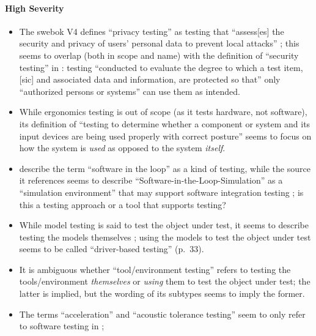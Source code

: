 \ifnotpaper\paragraph{High Severity}\fi
\begin{itemize}
    \item The \acs{swebok} V4 defines ``privacy testing'' as testing that
          ``assess[es] the security and privacy of users' personal data to
          prevent local attacks'' \citep[p.~5-10]{SWEBOK2024}; this seems to
          overlap (both in scope and name) with
          the definition of ``security testing'' in \citep{IEEE2022}: testing
          ``conducted to evaluate the degree to which a test item, [sic] and
          associated data and information, are protected so that'' only
          ``authorized persons or systems'' can use them as intended.
          \ifnotpaper
    \item While ergonomics testing is out of scope (as it tests hardware, not
          software), its definition of ``testing to determine whether a
          component or system and its input devices are being used properly
          with correct posture'' \citepISTQB{} seems to focus on how the
          system is \emph{used} as opposed to the system \emph{itself}.
    \item \citetISTQB{} describe the term ``software in the loop'' as a
          kind of testing, while the source it references seems to describe
          ``Software-in-the-Loop-Simulation'' as a ``simulation environment''
          that may support software integration testing
          \citep[p.~153]{SPICE2022}; is this a testing approach or a tool
          that supports testing?
    \item While model testing is said to test the object under test,
          it seems to describe testing the models themselves
          \citet[p.~20]{Firesmith2015}; using the models to test the object
          under test seems to be called ``driver-based testing'' (p.~33).\fi
    \item It is ambiguous whether ``tool/environment testing'' refers to
          testing the tools/environment \emph{themselves} or \emph{using}
          them to test the object under test; the latter is implied, but the
          wording of its subtypes \citep[p.~25]{Firesmith2015} seems to imply
          the former.
          \ifnotpaper
    \item The terms ``acceleration'' and ``acoustic tolerance testing'' seem
          to only refer to software testing in \citep[p.~56]{Firesmith2015};

\end{itemize}
